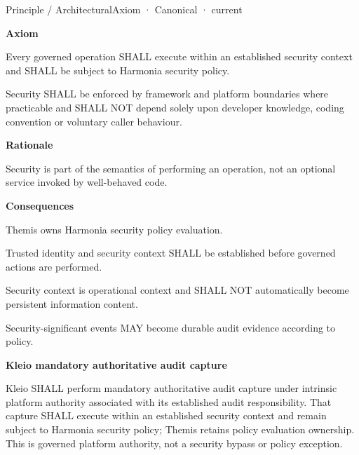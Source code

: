 \label{element:5de2ae2c3b794c2d9f3a14efd51d564f}
{\small Principle / ArchitecturalAxiom · Canonical · current}\par

\par\medskip\textbf{Axiom}\par


Every governed operation SHALL execute within an established security
context and SHALL be subject to Harmonia security policy.



Security SHALL be enforced by framework and platform boundaries where
practicable and SHALL NOT depend solely upon developer knowledge, coding
convention or voluntary caller behaviour.



\par\medskip\textbf{Rationale}\par


Security is part of the semantics of performing an operation, not an
optional service invoked by well-behaved code.



\par\medskip\textbf{Consequences}\par


Themis owns Harmonia security policy evaluation.



Trusted identity and security context SHALL be established before
governed actions are performed.



Security context is operational context and SHALL NOT automatically
become persistent information content.



Security-significant events MAY become durable audit evidence according
to policy.







\par\medskip\textbf{Kleio mandatory authoritative audit capture}\par


Kleio SHALL perform mandatory authoritative audit capture under intrinsic
platform authority associated with its established audit responsibility.
That capture SHALL execute within an established security context and remain
subject to Harmonia security policy; Themis retains policy evaluation ownership.
This is governed platform authority, not a security bypass or policy exception.




